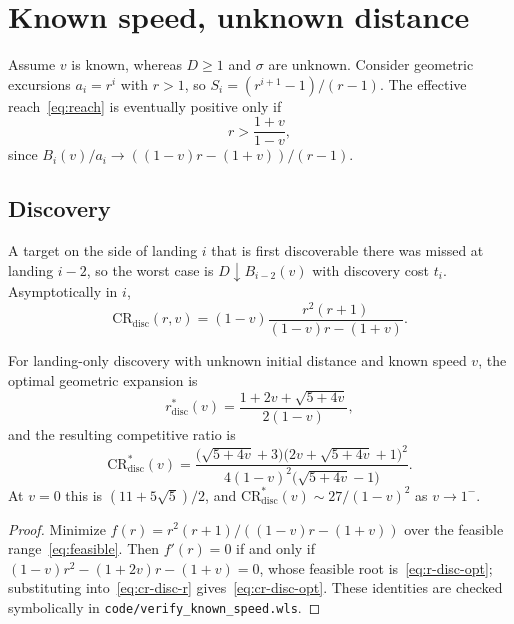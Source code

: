 \documentclass[runningheads,envcountsame,envcountsect]{llncs}
\newcommand{\CR}{\mathrm{CR}}
\newcommand{\disc}{\mathrm{disc}}
\begin{document}
\FloatBarrier
\section{Known speed, unknown distance}\label{sec:known-speed}

Assume $v$ is known, whereas $D \geq 1$ and $\sigma$ are unknown. Consider geometric excursions $a_i = r^i$ with $r > 1$, so $S_i = (r^{i+1} - 1)/(r - 1)$. The effective reach~\eqref{eq:reach} is eventually positive only if
\begin{equation}\label{eq:feasible}
  r > \frac{1 + v}{1 - v},
\end{equation}
since $B_i(v)/a_i \to ((1-v) r - (1+v))/(r-1)$.

\subsection{Discovery}

A target on the side of landing $i$ that is first discoverable there was missed at landing $i-2$, so the worst case is $D \downarrow B_{i-2}(v)$ with discovery cost $t_i$. Asymptotically in $i$,
\begin{equation}\label{eq:cr-disc-r}
  \CR_{\disc}(r, v) = (1 - v) \frac{r^2 (r + 1)}{(1 - v) r - (1 + v)} .
\end{equation}

\begin{theorem}\label{thm:disc-known}
For landing-only discovery with unknown initial distance and known speed $v$, the optimal geometric expansion is
\begin{equation}\label{eq:r-disc-opt}
  r^{*}_{\disc}(v) = \frac{1 + 2v + \sqrt{5 + 4v}}{2 (1 - v)},
\end{equation}
and the resulting competitive ratio is
\begin{equation}\label{eq:cr-disc-opt}
  \CR^{*}_{\disc}(v) = \frac{\big(\sqrt{5 + 4v} + 3\big)\big(2v + \sqrt{5 + 4v} + 1\big)^2}{4 (1 - v)^2 \big(\sqrt{5 + 4v} - 1\big)} .
\end{equation}
At $v = 0$ this is $(11 + 5\sqrt5)/2$, and $\CR^{*}_{\disc}(v) \sim 27/(1-v)^2$ as $v \to 1^-$.
\end{theorem}
\begin{proof}
Minimize $f(r) = r^2(r+1)/((1-v) r - (1+v))$ over the feasible range~\eqref{eq:feasible}. Then $f'(r) = 0$ if and only if $(1-v) r^2 - (1 + 2v) r - (1+v) = 0$, whose feasible root is~\eqref{eq:r-disc-opt}; substituting into~\eqref{eq:cr-disc-r} gives~\eqref{eq:cr-disc-opt}. These identities are checked symbolically in \texttt{code/verify\_known\_speed.wls}.
\end{proof}
\end{document}
